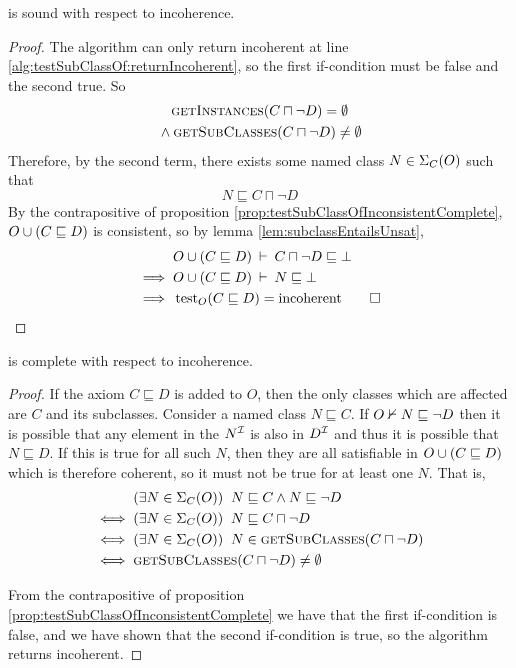 \documentclass[paper.tex]{subfiles}
\begin{document}
\begin{proposition}
  \label{prop:testSubClassOfIncoherentSound}
   is sound with respect to incoherence.
\end{proposition}
\begin{proof}
  The algorithm can only return incoherent at line \ref{alg:testSubClassOf:returnIncoherent}, so the first if-condition must be false and the second true.  So
  \begin{multline*}
    \Call{getInstances}{C \sqcap \neg D} = \emptyset \\
    {} \land \Call{getSubClasses}{C \sqcap \neg D} \ne \emptyset
  \end{multline*}
  Therefore, by the second term, there exists some named class $N \in \Sigma_C(O)$ such that
  \[ N \sqsubseteq C \sqcap \neg D \]
  By the contrapositive of proposition \ref{prop:testSubClassOfInconsistentComplete}, $O \cup (C \sqsubseteq D)$ is consistent, so by lemma \ref{lem:subclassEntailsUnsat},
  \begin{align*}
    & O \cup (C \sqsubseteq D) \:\vdash\: C \sqcap \neg D \sqsubseteq \bot \\
    \implies{}& O \cup (C \sqsubseteq D) \:\vdash\: N \sqsubseteq \bot \\
    \implies{}& \operatorname{test}_O(C \sqsubseteq D) = \mathrm{incoherent}
    \qed
  \end{align*}
\end{proof}

\begin{proposition}
  \label{prop:testSubClassOfIncoherentComplete}
   is complete with respect to incoherence.
\end{proposition}
\begin{proof}
  If the axiom $C \sqsubseteq D$ is added to $O$, then the only classes which are affected are $C$ and its subclasses.  Consider a named class $N \sqsubseteq C$.  If $O \nvdash N \sqsubseteq \neg D$ then it is possible that any element in the $N^{\mathcal{I}}$ is also in $D^{\mathcal{I}}$ and thus it is possible that $N \sqsubseteq D$.  If this is true for all such $N$, then they are all satisfiable in $O \cup (C \sqsubseteq D)$ which is therefore coherent, so it must not be true for at least one $N$.  That is,
  \begin{align*}
    & (\exists N \in \signatureC(O)) \;\; N \sqsubseteq C \land N \sqsubseteq \neg D \\
    \iff{}& (\exists N \in \signatureC(O)) \;\; N \sqsubseteq C \sqcap \neg D \\
    \iff{}& (\exists N \in \signatureC(O)) \;\; N \in \Call{getSubClasses}{C \sqcap \neg D} \\
    \iff{}& \Call{getSubClasses}{C \sqcap \neg D} \ne \emptyset
  \end{align*}

  From the contrapositive of proposition \ref{prop:testSubClassOfInconsistentComplete} we have that the first if-condition is false, and we have shown that the second if-condition is true, so the algorithm returns incoherent.
\end{proof}
\end{document}

